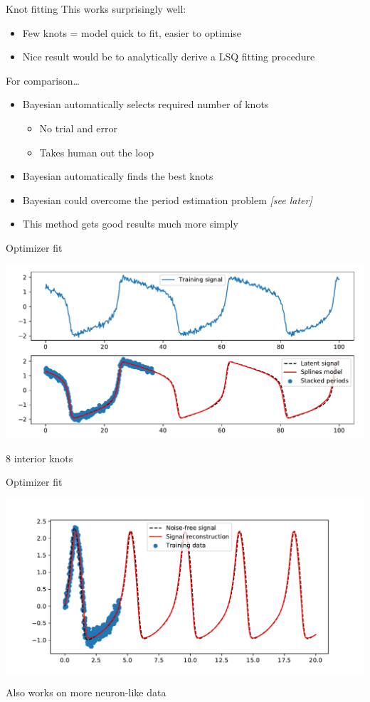 \documentclass[presentation]{beamer}
\begin{document}
\begin{frame}[label={sec:org51a532d}]{Knot fitting}
This works surprisingly well:
\begin{itemize}
\item Few knots = model quick to fit, easier to optimise
\item Nice result would be to analytically derive a LSQ fitting procedure
\end{itemize}
\vfill
For comparison\ldots{}
\begin{itemize}[<+->]
\item Bayesian automatically selects required number of knots
\begin{itemize}
\item No trial and error
\item Takes human out the loop
\end{itemize}
\item Bayesian automatically finds the best knots
\item Bayesian could overcome the period estimation problem \emph{[see later]}
\item This method gets good results much more simply
\end{itemize}
\end{frame}

\begin{frame}[label={sec:org412a77c}]{Optimizer fit}
   \begin{center}
\includegraphics[width=.9\linewidth]{./fit3.pdf}
\end{center}
8 interior knots
\end{frame}

\begin{frame}[label={sec:orgac57456}]{Optimizer fit}
   \begin{center}
\includegraphics[width=.9\linewidth]{./HRFit.pdf}
\end{center}
Also works on more neuron-like data
\end{frame}
\end{document}
